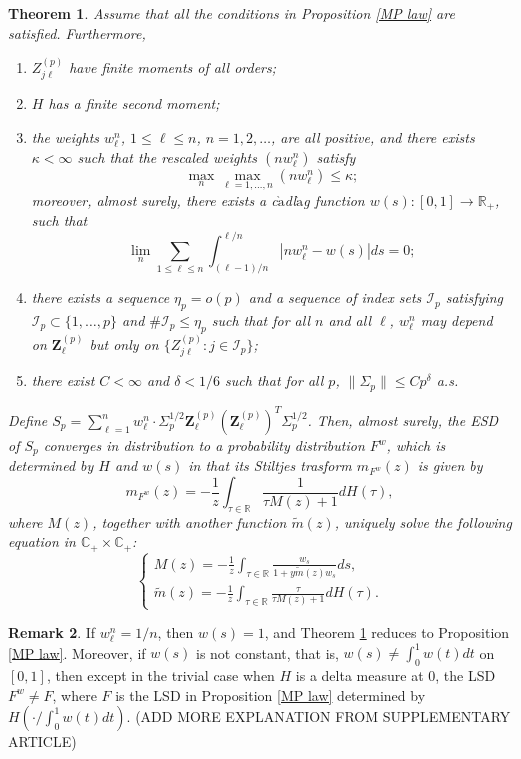 \documentclass[a4paper,11pt]{article}
\theoremstyle{plain}
\newtheorem{thm}{Theorem}[part]%
\theoremstyle{definition}
\newtheorem{rmrk}[thm]{Remark}
\newcommand{\MR}{\mathbb{R}}
\begin{document}
    \begin{thm} \label{Thm 1}
    	Assume that all the conditions in Proposition \ref{MP law} are satisfied. Furthermore,
    	\begin{enumerate}
    		\item $Z_{j\ell}^{(p)}$ have finite moments of all orders;
    		\item $H$ has a finite second moment;
    		\item the weights $w_\ell^n$, $1 \leq \ell \leq n$, $n = 1, 2, \dots$, are all positive, and there exists $\kappa < \infty$ such that the rescaled weights $(nw_\ell^n)$ satisfy
    		\[ \max_n \max_{\ell = 1, \dots, n} (nw_\ell^n) \leq \kappa; \]
    		moreover, almost surely, there exists a c$\grave{\text{a}}$dl$\grave{\text{a}}$g function $w(s): [0, 1] \rightarrow \MR_{+}$, such that
    		\[ \lim_n \sum_{1 \leq \ell \leq n} \int_{(\ell-1)/n}^{\ell/n} |n w_\ell^n - w(s)|ds = 0; \]
    		\item there exists a sequence $\eta_p = o(p)$ and a sequence of index sets $\mathcal{I}_p$ satisfying $\mathcal{I}_p \subset \{1, \dots, p\}$ and $\#\mathcal{I}_p \leq \eta_p$ such that for all $n$ and all $\ell$, $w_\ell^n$ may depend on $\mathbf{Z}_\ell^{(p)}$ but only on $\{ Z_{j\ell}^{(p)}: j \in \mathcal{I}_p \}$;
    		\item there exist $C < \infty$ and $\delta < 1/6$ such that for all $p$, $\| \Sigma_p \| \leq Cp^\delta$ a.s.
    	\end{enumerate}
    	Define $S_p = \sum_{\ell=1}^{n} w_\ell^n \cdot \Sigma_p^{1/2} \mathbf{Z}_\ell^{(p)} (\mathbf{Z}_\ell^{(p)})^T\Sigma_p^{1/2} $. Then, almost surely, the ESD of $S_p$ converges in distribution to a probability distribution $F^w$, which is determined by $H$ and $w(s)$ in that its Stiltjes trasform $m_{F^w}(z)$ is given by
    	\[ m_{F^w}(z) = -\frac{1}{z} \int_{\tau \in \MR} \frac{1}{\tau M(z) + 1} dH(\tau), \]
    	where $M(z)$, together with another function $\tilde{m}(z)$, uniquely solve the following equation in $\mathbb{C}_{+} \times \mathbb{C}_{+}$:
    	\[
    	\left \{
    	\begin{array}{l}
    		M(z) = -\frac{1}{z} \int_{\tau \in \MR} \frac{w_s}{1 + y \tilde{m}(z)w_s} ds,  \\
    		\tilde{m}(z) =  -\frac{1}{z} \int_{\tau \in \MR} \frac{\tau}{\tau M(z) + 1} dH(\tau).
    	\end{array}
    	\right.
    	\]
    \end{thm}
    
    \begin{rmrk}
    	If $w_\ell^n = 1/n$, then $w(s)=1$, and Theorem \ref{Thm 1} reduces to Proposition \ref{MP law}. Moreover, if $w(s)$ is not constant, that is, $w(s) \neq \int_{0}^{1} w(t) dt$ on $[0, 1]$, then except in the trivial case when $H$ is a delta measure at $0$, the LSD $F^w \neq F$, where $F$ is the LSD in Proposition \ref{MP law} determined by $H(\cdot / \int_{0}^{1} w(t) dt)$. (ADD MORE EXPLANATION FROM SUPPLEMENTARY ARTICLE)
    \end{rmrk}
    
\end{document}
